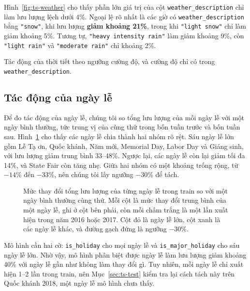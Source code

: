 Hình~\ref{fig:ts-weather} cho thấy phần lớn giá trị của cột \texttt{weather\_description} chỉ làm lưu lượng lệch dưới 4\%. Ngoại lệ rõ nhất
là các giờ có \texttt{weather\_description} bằng \texttt{"snow"}, khi lưu lượng \textbf{giảm khoảng 21\%}, trong khi \texttt{"light snow"}
chỉ làm giảm khoảng 5\%. Tương tự, \texttt{"heavy intensity rain"} làm giảm khoảng 9\%, còn \texttt{"light rain"} và
\texttt{"moderate rain"} chỉ khoảng 2\%.

\begin{tsinsight}
Tác động của thời tiết theo ngưỡng cường độ, và cường độ chỉ có trong \texttt{weather\_description}.
\end{tsinsight}

\subsection{Tác động của ngày lễ}
\label{sec:ts-holiday}
Để đo tác động của ngày lễ, chúng tôi so tổng lưu lượng của mỗi ngày lễ với một ngày bình thường, tức trung vị của cùng thứ trong bốn tuần
trước và bốn tuần sau. Hình~\ref{fig:ts-holiday} cho thấy các ngày lễ chia thành hai nhóm rõ rệt. Sáu ngày lễ lớn gồm Lễ Tạ ơn, Quốc khánh,
Năm mới, Memorial Day, Labor Day và Giáng sinh, với lưu lượng giảm trung bình 33--48\%. Ngược lại, các ngày lễ còn lại giảm tối đa 14\%, và
State Fair còn tăng nhẹ. Giữa hai nhóm có một khoảng trống rộng, từ $-14\%$ đến $-33\%$, nên chúng tôi lấy ngưỡng $-30\%$ để tách.

\begin{figure}[H]
\centering
{}
\caption{Mức thay đổi tổng lưu lượng của từng ngày lễ trong train so với một ngày bình thường cùng thứ. Mỗi cột là mức thay đổi trung bình
của một ngày lễ, ghi ở cột bên phải, còn mỗi chấm trắng là một lần xuất hiện trong năm 2016 hoặc 2017. Cột đỏ là ngày lễ lớn, cột xanh là các
ngày lễ khác, và đường gạch đứng là ngưỡng $-30\%$.}
\label{fig:ts-holiday}
\end{figure}

\begin{tsinsight}
Mô hình cần hai cờ: \texttt{is\_holiday} cho mọi ngày lễ và \texttt{is\_major\_holiday} cho sáu ngày lễ lớn. Nhờ vậy, mô hình phân biệt được
ngày lễ làm lưu lượng giảm khoảng 40\% với ngày lễ gần như không làm thay đổi gì. Tuy nhiên, mỗi ngày lễ chỉ xuất hiện 1--2 lần trong train,
nên Mục~\ref{sec:ts-test} kiểm tra lại cách tách này trên Quốc khánh 2018, một ngày lễ mô hình chưa thấy.
\end{tsinsight}

